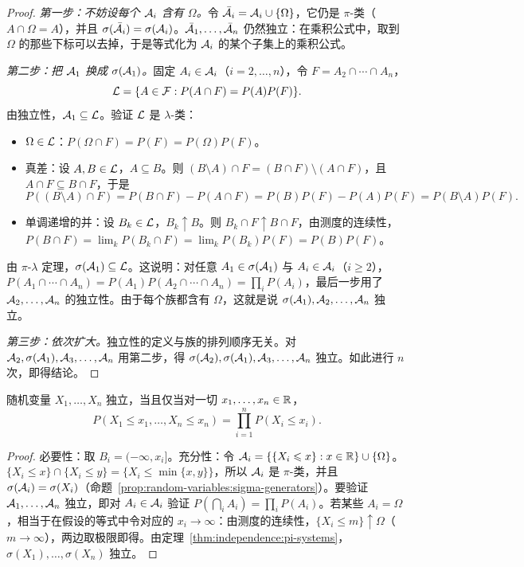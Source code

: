 \begin{proof}
\emph{第一步：不妨设每个 $\mathcal{A}_i$ 含有 $\Omega$。}令 $\bar{\mathcal{A}}_i=\mathcal{A}_i\cup\{\Omega\}$，它仍是 $\pi$-类（$A\cap\Omega=A$），并且 $\sigma(\bar{\mathcal{A}}_i)=\sigma(\mathcal{A}_i)$。$\bar{\mathcal{A}}_1,\dots,\bar{\mathcal{A}}_n$ 仍然独立：在乘积公式中，取到 $\Omega$ 的那些下标可以去掉，于是等式化为 $\mathcal{A}_i$ 的某个子集上的乘积公式。

\emph{第二步：把 $\mathcal{A}_1$ 换成 $\sigma(\mathcal{A}_1)$。}固定 $A_i\in\mathcal{A}_i$（$i=2,\dots,n$），令 $F=A_2\cap\cdots\cap A_n$，
\[
\mathcal{L}=\{A\in\mathcal{F}:P(A\cap F)=P(A)P(F)\}.
\]
由独立性，$\mathcal{A}_1\subseteq\mathcal{L}$。验证 $\mathcal{L}$ 是 $\lambda$-类：
\begin{itemize}
\item $\Omega\in\mathcal{L}$：$P(\Omega\cap F)=P(F)=P(\Omega)P(F)$。
\item 真差：设 $A,B\in\mathcal{L}$，$A\subseteq B$。则 $(B\setminus A)\cap F=(B\cap F)\setminus(A\cap F)$，且 $A\cap F\subseteq B\cap F$，于是
\[
P((B\setminus A)\cap F)=P(B\cap F)-P(A\cap F)=P(B)P(F)-P(A)P(F)=P(B\setminus A)P(F).
\]
\item 单调递增的并：设 $B_k\in\mathcal{L}$，$B_k\uparrow B$。则 $B_k\cap F\uparrow B\cap F$，由测度的连续性，$P(B\cap F)=\lim_kP(B_k\cap F)=\lim_kP(B_k)P(F)=P(B)P(F)$。
\end{itemize}
由 $\pi$-$\lambda$ 定理，$\sigma(\mathcal{A}_1)\subseteq\mathcal{L}$。这说明：对任意 $A_1\in\sigma(\mathcal{A}_1)$ 与 $A_i\in\mathcal{A}_i$（$i\geqslant2$），$P(A_1\cap\cdots\cap A_n)=P(A_1)P(A_2\cap\cdots\cap A_n)=\prod_iP(A_i)$，最后一步用了 $\mathcal{A}_2,\dots,\mathcal{A}_n$ 的独立性。由于每个族都含有 $\Omega$，这就是说 $\sigma(\mathcal{A}_1),\mathcal{A}_2,\dots,\mathcal{A}_n$ 独立。

\emph{第三步：依次扩大。}独立性的定义与族的排列顺序无关。对 $\mathcal{A}_2,\sigma(\mathcal{A}_1),\mathcal{A}_3,\dots,\mathcal{A}_n$ 用第二步，得 $\sigma(\mathcal{A}_2),\sigma(\mathcal{A}_1),\mathcal{A}_3,\dots,\mathcal{A}_n$ 独立。如此进行 $n$ 次，即得结论。
\end{proof}

\begin{corollary}[用分布函数判别独立性]\label{cor:independence:df}
随机变量 $X_1,\dots,X_n$ 独立，当且仅当对一切 $x_1,\dots,x_n\in\mathbb{R}$，
\[
P(X_1\leqslant x_1,\dots,X_n\leqslant x_n)=\prod_{i=1}^nP(X_i\leqslant x_i).
\]
\end{corollary}
\begin{proof}
必要性：取 $B_i=(-\infty,x_i]$。充分性：令 $\mathcal{A}_i=\{\{X_i\leqslant x\}:x\in\mathbb{R}\}\cup\{\Omega\}$。$\{X_i\leqslant x\}\cap\{X_i\leqslant y\}=\{X_i\leqslant\min\{x,y\}\}$，所以 $\mathcal{A}_i$ 是 $\pi$-类，并且 $\sigma(\mathcal{A}_i)=\sigma(X_i)$（命题~\ref{prop:random-variables:sigma-generators}）。要验证 $\mathcal{A}_1,\dots,\mathcal{A}_n$ 独立，即对 $A_i\in\mathcal{A}_i$ 验证 $P(\bigcap_iA_i)=\prod_iP(A_i)$。若某些 $A_i=\Omega$，相当于在假设的等式中令对应的 $x_i\to\infty$：由测度的连续性，$\{X_i\leqslant m\}\uparrow\Omega$（$m\to\infty$），两边取极限即得。由定理~\ref{thm:independence:pi-systems}，$\sigma(X_1),\dots,\sigma(X_n)$ 独立。
\end{proof}

